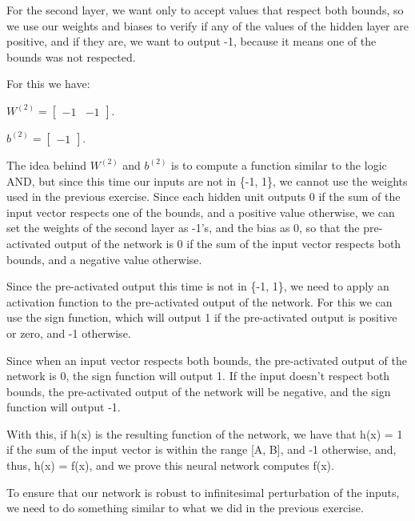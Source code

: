 \documentclass{article}
\begin{document}
\bigskip

For the second layer, we want only to accept values that respect both bounds, so we use our weights and biases to verify if any of the values
of the hidden layer are positive, and if they are, we want to output -1, because it means one of the bounds was not respected.

\bigskip

For this we have:

\bigskip

\( W^{(2)} = \begin{bmatrix}
    -1 & -1
\end{bmatrix}
\).

\bigskip

\(b^{(2)} = \begin{bmatrix}
    -1
\end{bmatrix}
\).

\bigskip

The idea behind \(W^{(2)}\) and \(b^{(2)}\) is to compute a function similar to the logic AND, but since this time our inputs are not in 
\{-1, 1\}, we cannot use the weights used in the previous exercise.
Since each hidden unit outputs 0 if the sum of the input vector respects one of the bounds, and a positive value otherwise, we can set the 
weights of the second layer as -1's, and the bias as 0, so that the pre-activated output of the network is 0 if the sum of the input vector 
respects both bounds, and a negative value otherwise.

\bigskip

Since the pre-activated output this time is not in \{-1, 1\}, we need to apply an activation function to the pre-activated output of the network. 
For this we can use the sign function, which will output 1 if the pre-activated output is positive or zero, and -1 otherwise.

Since when an input vector respects both bounds, the pre-activated output of the network is 0, the sign function will output 1. If the input doesn't
respect both bounds, the pre-activated output of the network will be negative, and the sign function will output -1.

With this, if h(x) is the resulting function of the network, we have that h(x) = 1 if the sum of the input vector is within the range [A, B], 
and -1 otherwise, and, thus, h(x) = f(x), and we prove this neural network computes f(x).

\bigskip

To ensure that our network is robust to infinitesimal perturbation of the inputs, we need to do something similar to what we did in the previous exercise.
\end{document}
